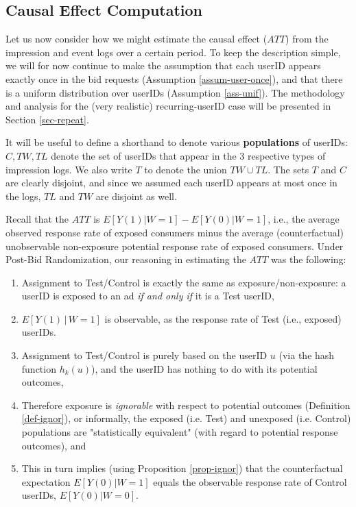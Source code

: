 \documentclass[11pt,a4paper]{article}
\theoremstyle{definition}
\theoremstyle{remark}
\theoremstyle{definition}
\theoremstyle{definition}
\theoremstyle{definition}
\theoremstyle{definition}
\theoremstyle{definition}
\theoremstyle{definition}
\begin{document}
\subsection{Causal Effect Computation}\label{sec-causal-pre-bid}

Let us now consider how we might estimate the causal effect ($ATT$) from the impression and event logs over a certain period. To keep the description simple, we will for now continue to make the assumption that each userID appears exactly once in the bid requests (Assumption \ref{assum-user-once}), and that there is a uniform distribution over userIDs (Assumption \ref{ass-unif}). The methodology and analysis for the (very realistic) recurring-userID case will be presented in Section \ref{sec-repeat}.

It will be useful to define a shorthand to denote various \textbf{populations} of userIDs: $C, TW, TL$ denote the set of userIDs that appear in the 3 respective types of impression logs. We also write $T$ to denote the union $TW \cup TL$. The sets $T$ and $C$ are clearly disjoint, and since we assumed each userID appears at most once in the logs, $TL$ and $TW$ are disjoint as well.


Recall that the $ATT$ is $E[ Y(1) | W=1] - E[Y(0) | W=1]$, i.e., the average observed response rate of exposed consumers minus the average (counterfactual) unobservable non-exposure potential response rate of exposed consumers. 
Under Post-Bid Randomization, our reasoning in estimating the $ATT$ was the following: 
\begin{enumerate}

	\item Assignment to Test/Control is exactly the same as exposure/non-exposure: a userID is exposed to an ad {\em if and only if} it is a Test userID,
	\item $E[Y(1) \,|\, W=1]$ is observable, as the response rate of Test (i.e., exposed) userIDs.
	\item Assignment to Test/Control is purely based on the userID $u$ (via the hash function $h_k(u)$), and the userID has nothing to do with its potential outcomes,
	\item Therefore exposure is \textit{ignorable} with respect to potential outcomes (Definition \ref{def-ignor}), or informally, the exposed (i.e. Test) and unexposed (i.e. Control) populations are "statistically equivalent" (with regard to potential response outcomes), and 
	\item This in turn implies (using Proposition \ref{prop-ignor}) that the counterfactual expectation $E[Y(0)|W=1]$ equals the observable response rate of Control userIDs, $E[Y(0)|W=0]$. 
\end{enumerate}
\end{document}

